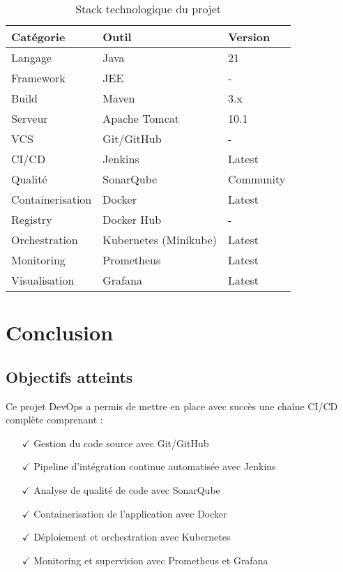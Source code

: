 \documentclass[12pt,a4paper]{article}
\begin{document}
\begin{table}[H]
\centering
\begin{tabular}{|l|l|l|}
\hline
\textbf{Catégorie} & \textbf{Outil} & \textbf{Version} \\ \hline
Langage & Java & 21 \\ \hline
Framework & JEE & - \\ \hline
Build & Maven & 3.x \\ \hline
Serveur & Apache Tomcat & 10.1 \\ \hline
VCS & Git/GitHub & - \\ \hline
CI/CD & Jenkins & Latest \\ \hline
Qualité & SonarQube & Community \\ \hline
Containerisation & Docker & Latest \\ \hline
Registry & Docker Hub & - \\ \hline
Orchestration & Kubernetes (Minikube) & Latest \\ \hline
Monitoring & Prometheus & Latest \\ \hline
Visualisation & Grafana & Latest \\ \hline
\end{tabular}
\caption{Stack technologique du projet}
\label{tab:tech_stack}
\end{table}

\newpage

\section{Conclusion}

\subsection{Objectifs atteints}

Ce projet DevOps a permis de mettre en place avec succès une chaîne CI/CD complète comprenant :

\begin{itemize}
    \item[$\checkmark$] Gestion du code source avec Git/GitHub
    \item[$\checkmark$] Pipeline d'intégration continue automatisée avec Jenkins
    \item[$\checkmark$] Analyse de qualité de code avec SonarQube
    \item[$\checkmark$] Containerisation de l'application avec Docker
    \item[$\checkmark$] Déploiement et orchestration avec Kubernetes
    \item[$\checkmark$] Monitoring et supervision avec Prometheus et Grafana
\end{itemize}
\end{document}
